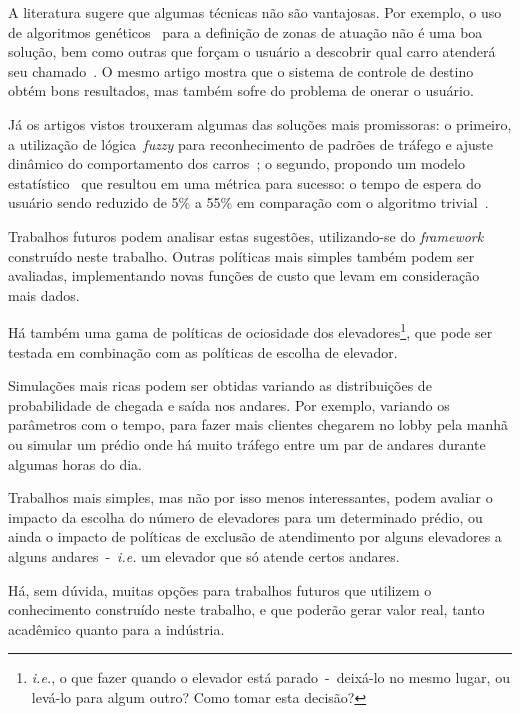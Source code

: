 A literatura sugere que algumas técnicas não são vantajosas. Por exemplo, o uso
de algoritmos genéticos~\cite{KOEHLEROTTIGER02} para a definição de zonas de
atuação não é uma boa solução, bem como outras que forçam o usuário a descobrir
qual carro atenderá seu chamado~\cite{KOEHLEROTTIGER02}. O mesmo artigo mostra que o sistema de controle
de destino~\cite{KOEHLEROTTIGER02} obtém bons resultados, mas também sofre do
problema de onerar o usuário.

Já os artigos vistos trouxeram algumas das soluções mais promissoras: o
primeiro, a utilização de lógica~\textit{fuzzy} para reconhecimento de padrões
de tráfego e ajuste dinâmico do comportamento dos carros~\cite{marja97}; o
segundo, propondo um modelo estatístico~\cite{DBLP:journals/corr/abs-1212-2499}
que resultou em uma métrica para sucesso: o tempo de espera do usuário sendo
reduzido de 5\% a 55\% em comparação com o algoritmo
trivial~\cite{DBLP:journals/corr/abs-1212-2499}.

Trabalhos futuros podem analisar estas sugestões, utilizando-se do
\textit{framework} construído neste trabalho. Outras políticas mais simples
também podem ser avaliadas, implementando novas funções de custo que levam em
consideração mais dados.

Há também uma gama de políticas de ociosidade dos
elevadores\footnote{\textit{i.e.}, o que fazer quando o elevador está
  parado~-~deixá-lo no mesmo lugar, ou levá-lo para algum outro? Como tomar esta
decisão?}, que pode ser testada em combinação com as políticas de escolha de elevador.

Simulações mais ricas podem ser obtidas variando as distribuições de
probabilidade de chegada e saída nos andares. Por exemplo, variando os
parâmetros com o tempo, para fazer mais clientes chegarem no lobby pela manhã ou
simular um prédio onde há muito tráfego entre um par de andares durante algumas
horas do dia.

Trabalhos mais simples, mas não por isso menos interessantes, podem avaliar o
impacto da escolha do número de elevadores para um determinado prédio, ou ainda
o impacto de políticas de exclusão de atendimento por alguns elevadores a alguns
andares~-~\textit{i.e.} um elevador que só atende certos andares.

Há, sem dúvida, muitas opções para trabalhos futuros que utilizem o conhecimento
construído neste trabalho, e que poderão gerar valor real, tanto acadêmico
quanto para a indústria.
